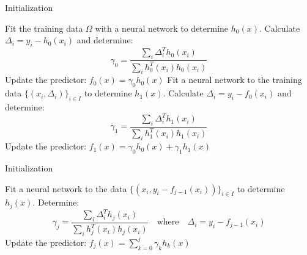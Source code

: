 \begin{algorithm}
	\caption{Initialization}\label{algorithm_first}
	\begin{algorithmic}[1]
		\State Fit the training data $\Omega$ with a neural network to determine $h_0(x)$.
		\State Calculate $\Delta_i=y_i-h_0(x_i)$ and determine:
		\begin{equation*}
			\gamma_0=\frac{\sum_{i}\Delta_i^Th_0(x_i)}{\sum_{i}h_0^T(x_i)h_0(x_i)}
		\end{equation*}
		\State Update the predictor: $f_0(x)=\gamma_0h_0(x)$
		\State Fit a neural network to the training data $\{(x_i, \Delta_i)\}_{i\in I}$ to determine $h_1(x)$.
		\State Calculate $\Delta_i=y_i-f_0(x_i)$ and determine:
		\begin{equation*}
		\gamma_1=\frac{\sum_{i}\Delta_i^Th_1(x_i)}{\sum_{i}h_1^T(x_i)h_1(x_i)}
		\end{equation*}
		\State Update the predictor: $f_1(x)=\gamma_0h_0(x)+\gamma_1h_1(x)$
	\end{algorithmic}
\end{algorithm}

\begin{algorithm}
	\caption{Initialization}\label{algorithm_loop}
	\begin{algorithmic}[1]
		\State Fit a neural network to the data $\{(x_i, y_i-f_{j-1}(x_i))\}_{i\in I}$ to determine $h_j(x)$.
		\State Determine:
		\begin{equation*}
		\gamma_j=\frac{\sum_{i}\Delta_i^Th_j(x_i)}{\sum_{i}h_j^T(x_i)h_j(x_i)}\quad\text{where}\quad\Delta_i=y_i-f_{j-1}(x_i)
		\end{equation*}
		\State Update the predictor: $f_j(x)=\sum_{k=0}^{j}\gamma_kh_k(x)$
	\end{algorithmic}
\end{algorithm}

